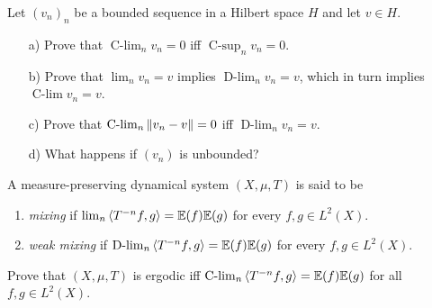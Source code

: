 \documentclass[reqno, twoside]{article}
\newcommand{\Clim}{\operatorname{C-lim}}
\newcommand{\Csup}{\operatorname{C-sup}}
\newcommand{\Dlim}{\operatorname{D-lim}}
\begin{document}
    \begin{exercise}\label{equiv}
        Let $(v_n)_n$ be a bounded sequence in a Hilbert space $H$ and let $v\in H$. 
        \begin{enumerate}
            \item[a)] Prove that $\Clim_nv_n=0$ iff $\Csup_nv_n=0$.
                \vspace{-0.05in}
            \item[b)] Prove that $\lim_nv_n=v$ implies $\Dlim_nv_n=v$, which in turn implies $\Clim v_n=v$.
                \vspace{-0.05in}
            \item[c)] Prove that $\Clim_n\l\|v_n-v\r\|=0$ iff $\Dlim_nv_n=v$.
                \vspace{-0.05in}
            \item[d)] What happens if $(v_n)$ is unbounded?
        \end{enumerate}
    \end{exercise}

    \begin{definition*}
        A measure-preserving dynamical system $(X,\mu,T)$ is said to be
        \begin{enumerate}
            \item \textit{mixing} if $\lim_n\left\langle T^{-n}f,g\right\rangle=\mathbb{E}(f)\mathbb{E}(g)$ for every $f,g\in L^2(X)$.
                \vspace{-0.05in}
            \item \textit{weak mixing} if $\Dlim_n\l\langle T^{-n}f,g\r\rangle=\E(f)\E(g)$ for every $f,g\in L^2(X)$.
        \end{enumerate}
    \end{definition*}

    \begin{exercise}
        Prove that $(X,\mu,T)$ is ergodic iff $\Clim_n\l\langle T^{-n}f,g\r\rangle=\E(f)\E(g)$ for all $f,g\in L^2(X)$.
    \end{exercise}
\end{document}
